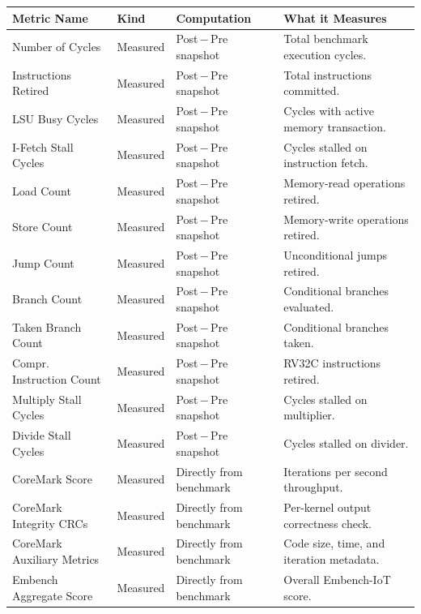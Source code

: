 \begin{table}[h]
\centering
\small
\setlength{\tabcolsep}{3.2pt}
\renewcommand{\arraystretch}{1.25}
\begin{tabularx}{\textwidth}{|p{}|p{}|X|X|}
\hline
Metric Name &
Kind &
Computation &
What it Measures \\
\hline
\hline
Number of Cycles &
Measured &
Post\,$-$\,Pre snapshot &
Total benchmark execution cycles. \\
\hline
Instructions Retired &
Measured &
Post\,$-$\,Pre snapshot &
Total instructions committed. \\
\hline
LSU Busy Cycles &
Measured &
Post\,$-$\,Pre snapshot &
Cycles with active memory transaction. \\
\hline
I-Fetch Stall Cycles &
Measured &
Post\,$-$\,Pre snapshot &
Cycles stalled on instruction fetch. \\
\hline
Load Count &
Measured &
Post\,$-$\,Pre snapshot &
Memory-read operations retired. \\
\hline
Store Count &
Measured &
Post\,$-$\,Pre snapshot &
Memory-write operations retired. \\
\hline
Jump Count &
Measured &
Post\,$-$\,Pre snapshot &
Unconditional jumps retired. \\
\hline
Branch Count &
Measured &
Post\,$-$\,Pre snapshot &
Conditional branches evaluated. \\
\hline
Taken Branch Count &
Measured &
Post\,$-$\,Pre snapshot &
Conditional branches taken. \\
\hline
Compr. Instruction Count &
Measured &
Post\,$-$\,Pre snapshot &
RV32C instructions retired. \\
\hline
Multiply Stall Cycles &
Measured &
Post\,$-$\,Pre snapshot &
Cycles stalled on multiplier. \\
\hline
Divide Stall Cycles &
Measured &
Post\,$-$\,Pre snapshot &
Cycles stalled on divider. \\
\hline
CoreMark Score &
Measured &
Directly from benchmark &
Iterations per second throughput. \\
\hline
CoreMark Integrity CRCs &
Measured &
Directly from benchmark &
Per-kernel output correctness check. \\
\hline
CoreMark Auxiliary Metrics &
Measured &
Directly from benchmark &
Code size, time, and iteration metadata. \\
\hline
Embench Aggregate Score &
Measured &
Directly from benchmark &
Overall Embench-IoT score. \\

\end{tabularx}
\end{table}
